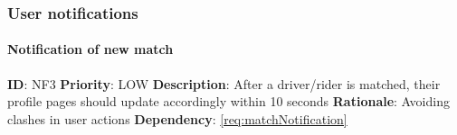 \documentclass{article}
\begin{document}
\subsubsection{User notifications}

\paragraph{Notification of new match}\label{req:}
\textbf{ID}: NF3\newline
\textbf{Priority}: LOW\newline
\textbf{Description}: After a driver/rider is matched, their profile pages should update accordingly within 10 seconds\newline
\textbf{Rationale}: Avoiding clashes in user actions\newline
\textbf{Dependency}: \ref{req:matchNotification} \newline



\newpage
\end{document}
